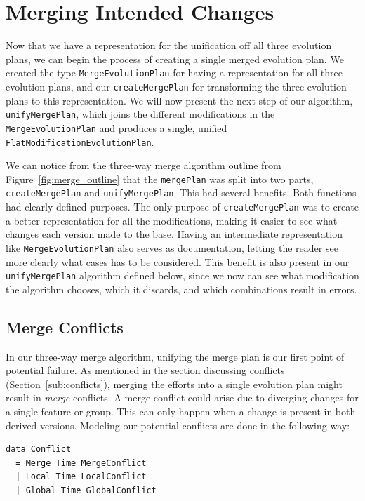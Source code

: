 \documentclass[a4paper,english]{ifimaster}
\begin{document}
\section{Merging Intended Changes}%
\label{sec:merging_intended_changes}

Now that we have a representation for the unification off all three evolution plans, we can begin the process of creating a single merged evolution plan. We created the type \texttt{MergeEvolutionPlan} for having a representation for all three evolution plans, and our \texttt{createMergePlan} for transforming the three evolution plans to this representation. We will now present the next step of our algorithm, \texttt{unifyMergePlan}, which joins the different modifications in the \texttt{MergeEvolutionPlan} and produces a single, unified \texttt{FlatModificationEvolutionPlan}.

We can notice from the three-way merge algorithm outline from Figure~\vref{fig:merge_outline} that the \texttt{mergePlan} was split into two parts, \texttt{createMergePlan} and \texttt{unifyMergePlan}. This had several benefits. Both functions had clearly defined purposes. The only purpose of \texttt{createMergePlan} was to create a better representation for all the modifications, making it easier to see what changes each version made to the base. Having an intermediate representation like \texttt{MergeEvolutionPlan} also serves as documentation, letting the reader see more clearly what cases has to be considered. This benefit is also present in our \texttt{unifyMergePlan} algorithm defined below, since we now can see what modification the algorithm chooses, which it discards, and which combinations result in errors.

\subsection{Merge Conflicts}%
\label{sub:merge_errors}

In our three-way merge algorithm, unifying the merge plan is our first point of potential failure. As mentioned in the section discussing conflicts (Section~\vref{sub:conflicts}), merging the efforts into a single evolution plan might result in \textit{merge} conflicts. A merge conflict could arise due to diverging changes for a single feature or group. This can only happen when a change is present in both derived versions. Modeling our potential conflicts are done in the following way:

\begin{verbatim}
data Conflict
  = Merge Time MergeConflict
  | Local Time LocalConflict
  | Global Time GlobalConflict
\end{verbatim}
\end{document}
